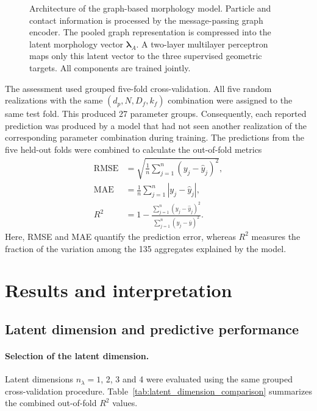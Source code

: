 \documentclass[12pt,a4paper]{article}
\begin{document}
\begin{figure}[!tbp]
{}
	
	\caption{Architecture of the graph-based morphology model. Particle and
		contact information is processed by the message-passing graph encoder.
		The pooled graph representation is compressed into the latent morphology
		vector $\boldsymbol{\lambda}_A$. A two-layer multilayer perceptron maps only
		this latent vector to the three supervised geometric targets. All
		components are trained jointly.}
	\label{fig:gnn_architecture}
\end{figure}

The assessment used grouped five-fold cross-validation. All five random
realizations with the same $(d_p,N,D_f,k_f)$ combination were assigned to the
same test fold. This produced 27 parameter groups.
Consequently, each reported prediction was produced by a model that had not
seen another realization of the corresponding parameter combination during
training. The predictions from the five held-out folds were combined to
calculate the out-of-fold metrics
\begin{align}
 \mathrm{RMSE} &=
 \sqrt{\frac{1}{n}\sum_{j=1}^{n}(y_j-\widehat{y}_j)^2},\\
 \mathrm{MAE} &=
 \frac{1}{n}\sum_{j=1}^{n}|y_j-\widehat{y}_j|,\\
 R^2 &= 1-
 \frac{\sum_{j=1}^{n}(y_j-\widehat{y}_j)^2}
      {\sum_{j=1}^{n}(y_j-\overline{y})^2}.
\end{align}
Here, RMSE and MAE quantify the prediction error, whereas $R^2$ measures the
fraction of the variation among the 135 aggregates explained by the model.

\section{Results and interpretation}
\label{sec:results_interpretation}

\subsection{Latent dimension and predictive performance}

\paragraph{Selection of the latent dimension.}
Latent dimensions $n_\lambda=1$, 2, 3 and 4 were evaluated using the same
grouped cross-validation procedure. Table~\ref{tab:latent_dimension_comparison}
summarizes the combined out-of-fold $R^2$ values.
\end{document}
